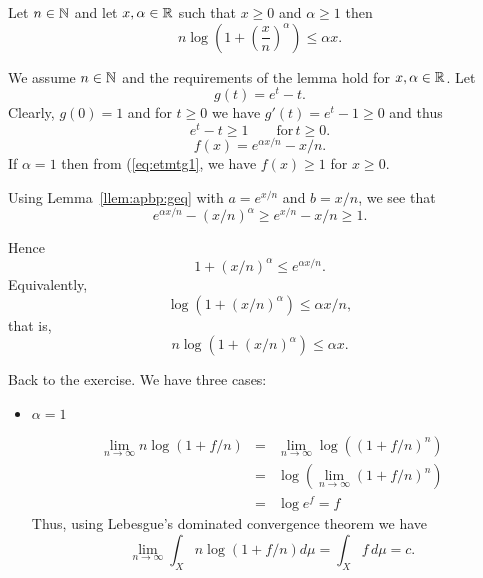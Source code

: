 \begin{enumerate}
\begin{llem} \label{llem:nlogx:leq}
Let \(n\in\mathbb{N}\)
and let \(x,\alpha\in\mathbb{R}\) such that \(x\geq 0\) and \(\alpha\geq 1\)
then
\begin{equation}
n\log\left(1 + \left(\frac{x}{n}\right)^\alpha\right) \leq \alpha x.
\end{equation}
\end{llem}

\begin{thmproof}
We assume \(n\in\mathbb{N}\) and the requirements of the lemma hold for
\(x,\alpha\in\mathbb{R}\).
Let
\begin{displaymath}
g(t) = e^t - t.
\end{displaymath}
Clearly, \(g(0)=1\) and for \(t\geq 0\)
we have \(g'(t) = e^t - 1 \geq 0\) and thus
\begin{equation} \label{eq:etmtg1}
e^t - t \geq 1 \qquad \textrm{for}\, t\geq 0.
\end{equation}
\begin{displaymath}
f(x) = e^{\alpha x/n} - x/n.
\end{displaymath}
If \(\alpha=1\) then from (\ref{eq:etmtg1}, we have \(f(x)\geq 1\)
for \(x\geq 0\).

Using Lemma~\ref{llem:apbp:geq}
with \(a=e^{x/n}\) and \(b=x/n\),
we see that
\begin{equation*}
e^{\alpha x/n} - (x/n)^\alpha \geq e^{x/n} - x/n \geq 1.
\end{equation*}

Hence
\begin{equation*}
1 + (x/n)^\alpha \leq e^{\alpha x/n}.
\end{equation*}
Equivalently,
\begin{equation*}
\log\left(1 + (x/n)^\alpha\right) \leq \alpha x/n,
\end{equation*}
that is,
\begin{equation*}
n\log\left(1 + (x/n)^\alpha\right) \leq \alpha x.
\end{equation*}
\end{thmproof}


Back to the exercise.
We have three cases:
\begin{itemize}

 \item \(\alpha=1\)

 \begin{eqnarray*}
  \lim_{n\to\infty} n\log (1 + f/n)
   &=& \lim_{n\to\infty} \log \left((1 + f/n)^n\right) \\
   &=& \log \left(\lim_{n\to\infty} (1 + f/n)^n\right) \\
   &=& \log e^f = f
 \end{eqnarray*}
 Thus, using Lebesgue's dominated convergence theorem
 we have
 \begin{equation*}
 \lim_{n\to\infty} \int_X n\log \left(1 + f/n\right)d\mu
  = \int_X f\,d\mu = c.
 \end{equation*}


\end{itemize}
\end{enumerate}
